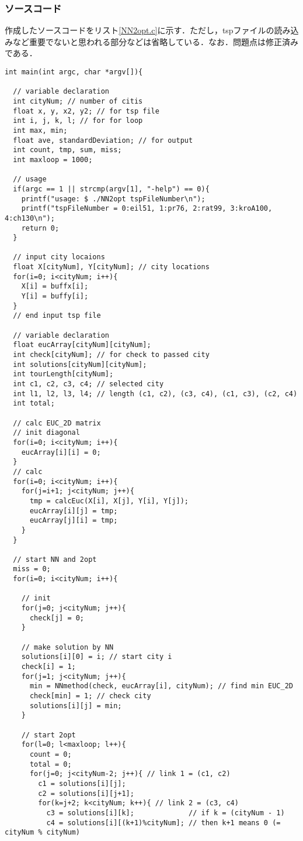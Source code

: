 \documentclass[a4j]{jarticle}
\begin{document}
\subsubsection*{ソースコード}
作成したソースコードをリスト\ref{NN2opt.c}に示す．ただし，tspファイルの読み込みなど重要でないと思われる部分などは省略している．なお．問題点は修正済みである．
\begin{lstlisting}[caption=NN2opt.c, label=NN2opt.c, xleftmargin=1cm]
int main(int argc, char *argv[]){

  // variable declaration
  int cityNum; // number of citis
  float x, y, x2, y2; // for tsp file
  int i, j, k, l; // for for loop
  int max, min;
  float ave, standardDeviation; // for output
  int count, tmp, sum, miss;
  int maxloop = 1000;

  // usage
  if(argc == 1 || strcmp(argv[1], "-help") == 0){
    printf("usage: $ ./NN2opt tspFileNumber\n");
    printf("tspFileNumber = 0:eil51, 1:pr76, 2:rat99, 3:kroA100, 4:ch130\n");
    return 0;
  }

  // input city locaions
  float X[cityNum], Y[cityNum]; // city locations
  for(i=0; i<cityNum; i++){
    X[i] = buffx[i];
    Y[i] = buffy[i];
  }
  // end input tsp file

  // variable declaration
  float eucArray[cityNum][cityNum];
  int check[cityNum]; // for check to passed city
  int solutions[cityNum][cityNum];
  int tourLength[cityNum];
  int c1, c2, c3, c4; // selected city
  int l1, l2, l3, l4; // length (c1, c2), (c3, c4), (c1, c3), (c2, c4)
  int total;

  // calc EUC_2D matrix
  // init diagonal 
  for(i=0; i<cityNum; i++){
    eucArray[i][i] = 0;
  }
  // calc 
  for(i=0; i<cityNum; i++){
    for(j=i+1; j<cityNum; j++){
      tmp = calcEuc(X[i], X[j], Y[i], Y[j]);
      eucArray[i][j] = tmp;
      eucArray[j][i] = tmp;
    }
  }

  // start NN and 2opt
  miss = 0;
  for(i=0; i<cityNum; i++){

    // init
    for(j=0; j<cityNum; j++){
      check[j] = 0;
    }
    
    // make solution by NN
    solutions[i][0] = i; // start city i
    check[i] = 1;
    for(j=1; j<cityNum; j++){
      min = NNmethod(check, eucArray[i], cityNum); // find min EUC_2D
      check[min] = 1; // check city
      solutions[i][j] = min;
    }

    // start 2opt
    for(l=0; l<maxloop; l++){
      count = 0;
      total = 0;
      for(j=0; j<cityNum-2; j++){ // link 1 = (c1, c2)
        c1 = solutions[i][j];
        c2 = solutions[i][j+1];
        for(k=j+2; k<cityNum; k++){ // link 2 = (c3, c4)
          c3 = solutions[i][k];             // if k = (cityNum - 1) 
          c4 = solutions[i][(k+1)%cityNum]; // then k+1 means 0 (= cityNum % cityNum)
          

\end{lstlisting}
\end{document}

